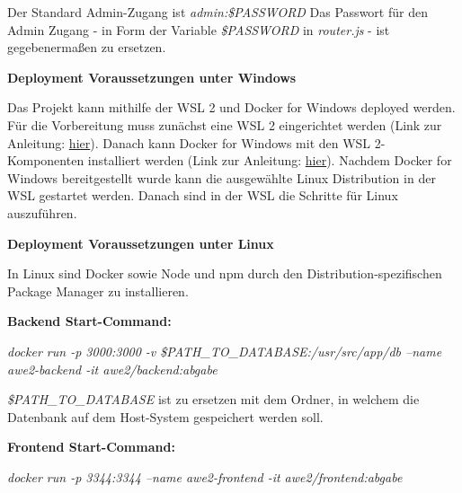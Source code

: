 Der Standard Admin-Zugang ist \textit{admin:\$PASSWORD} Das Passwort für den Admin Zugang - in Form der Variable \textit{\$PASSWORD} in \textit{router.js} - ist gegebenermaßen zu ersetzen.

\textbf{Deployment Voraussetzungen unter Windows}

Das Projekt kann mithilfe der WSL 2 und Docker for Windows deployed werden. Für die Vorbereitung muss zunächst eine WSL 2 eingerichtet werden (Link zur Anleitung: \href{https://docs.microsoft.com/en-us/windows/wsl/install-win10}{hier}). Danach kann Docker for Windows mit den WSL 2-Komponenten installiert werden (Link zur Anleitung: \href{https://docs.docker.com/docker-for-windows/wsl/}{hier}). Nachdem Docker for Windows bereitgestellt wurde kann die ausgewählte Linux Distribution in der WSL gestartet werden. Danach sind in der WSL die Schritte für Linux auszuführen.

\textbf{Deployment Voraussetzungen unter Linux}

In Linux sind Docker sowie Node und npm durch den Distribution-spezifischen Package Manager zu installieren.

\textbf{Backend Start-Command:}

\textit{docker run -p 3000:3000 -v \$PATH\_TO\_DATABASE:/usr/src/app/db --name awe2-backend -it awe2/backend:abgabe}

\textit{\$PATH\_TO\_DATABASE} ist zu ersetzen mit dem Ordner, in welchem die Datenbank auf dem Host-System gespeichert werden soll.

\textbf{Frontend Start-Command:}

\textit{docker run -p 3344:3344 --name awe2-frontend -it awe2/frontend:abgabe}
